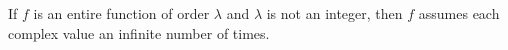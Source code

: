 If $f$ is an entire function of order $\lambda$ and $\lambda$ is not an integer, then $f$ assumes each complex value an infinite number of times.
